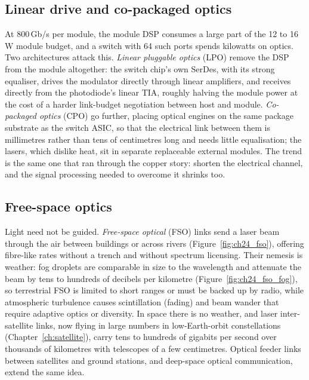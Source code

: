 \subsection{Linear drive and co-packaged optics}

At 800\,Gb/s per module, the module DSP consumes a large part of the 12 to 16\,W module budget, and a switch
with 64 such ports spends kilowatts on optics. Two architectures attack this. \emph{Linear pluggable optics}
(LPO) remove the DSP from the module altogether: the switch chip's own SerDes, with its strong equaliser,
drives the modulator directly through linear amplifiers, and receives directly from the photodiode's
linear TIA, roughly halving the module power at the cost of a harder link-budget negotiation between host
and module. \emph{Co-packaged optics} (CPO) go further, placing optical engines on the same package substrate
as the switch ASIC, so that the electrical link between them is millimetres rather than tens of centimetres
long and needs little equalisation; the lasers, which dislike heat, sit in separate replaceable external
modules. The trend is the same one that ran through the copper story: shorten the electrical channel, and
the signal processing needed to overcome it shrinks too.

\subsection{Free-space optics}

Light need not be guided. \emph{Free-space optical} (FSO) links send a laser beam through the air between
buildings or across rivers (Figure~\ref{fig:ch24_fso}), offering fibre-like rates without a trench and
without spectrum licensing. Their nemesis is weather: fog droplets are comparable in size to the
wavelength and attenuate the beam by tens to hundreds of decibels per kilometre
(Figure~\ref{fig:ch24_fso_fog}), so terrestrial FSO is limited to short ranges or must be backed up by
radio, while atmospheric turbulence causes scintillation (fading) and beam wander that require adaptive
optics or diversity. In space there is no weather, and laser inter-satellite links, now flying in large
numbers in low-Earth-orbit constellations (Chapter~\ref{ch:satellite}), carry tens to hundreds of gigabits
per second over thousands of kilometres with telescopes of a few centimetres. Optical feeder links between
satellites and ground stations, and deep-space optical communication, extend the same idea.


